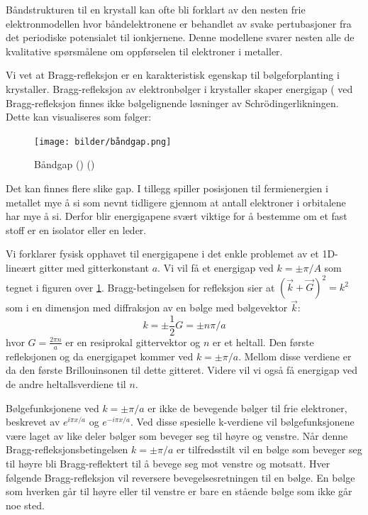 \documentclass{article}
\begin{document}
Båndstrukturen til en krystall kan ofte bli forklart av den nesten frie elektronmodellen hvor båndelektronene er behandlet av svake pertubasjoner fra det periodiske potensialet til ionkjernene. Denne modellene svarer nesten alle de kvalitative spørsmålene om oppførselen til elektroner i metaller.

Vi vet at Bragg-refleksjon er en karakteristisk egenskap til bølgeforplanting i krystaller. Bragg-refleksjon av elektronbølger i krystaller skaper energigap ( ved Bragg-refleksjon finnes ikke bølgelignende løsninger av Schrödingerlikningen. Dette kan visualiseres som følger:
\begin{figure}[H]
    \centering
    \texttt{[image: bilder/båndgap.png]}
    \caption{Båndgap (\cite{Aleksander}) (\cite{Sebastian})}
    \label{fig:båndgap}
\end{figure}
Det kan finnes flere slike gap. I tillegg spiller posisjonen til fermienergien i metallet mye å si som nevnt tidligere gjennom at antall elektroner i orbitalene har mye å si. Derfor blir energigapene svært viktige for å bestemme om et fast stoff er en isolator eller en leder.

Vi forklarer fysisk opphavet til energigapene i det enkle problemet av et 1D-lineært gitter med gitterkonstant $a$. Vi vil få et energigap ved $k = \pm \pi/A$ som tegnet i figuren over \ref{fig:båndgap}. Bragg-betingelsen for refleksjon sier at $(\vec{k} + \vec{G})^2 = k^2$ som i en dimensjon med diffraksjon av en bølge med bølgevektor $\vec{k}$:
\begin{equation}
    k = \pm \frac{1}{2} G = \pm n \pi / a
\end{equation}
hvor $G = \frac{2\pi n}{a}$ er en resiprokal gittervektor og $n$ er et heltall. Den første refleksjonen og da energigapet kommer ved $k = \pm \pi/a$. Mellom disse verdiene er da den første Brillouinsonen til dette gitteret. Videre vil vi også få energigap ved de andre heltallsverdiene til $n$.

Bølgefunksjonene ved $k=\pm \pi/a$ er ikke de bevegende bølger til frie elektroner, beskrevet av $e^{i \pi x / a}$ og $e^{-i \pi x / a}$. Ved disse spesielle k-verdiene vil bølgefunksjonene være laget av like deler bølger som beveger seg til høyre og venstre. Når denne Bragg-refleksjonsbetingelsen $k = \pm \pi / a$ er tilfredsstilt vil en bølge som beveger seg til høyre bli Bragg-reflektert til å bevege seg mot venstre og motsatt. Hver følgende Bragg-refleksjon vil reversere bevegelsesretningen til en bølge. En bølge som hverken går til høyre eller til venstre er bare en stående bølge som ikke går noe sted.
\end{document}
